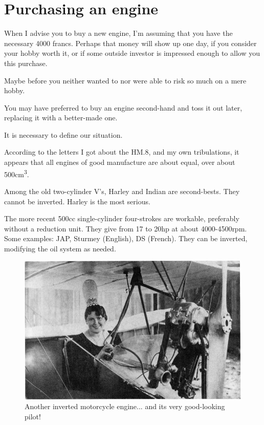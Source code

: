 \documentclass{book}
\begin{document}
\section{Purchasing an engine}

When I advise you to buy a new engine, I'm assuming that you have the
necessary 4000 francs.  Perhaps that money will show up one day, if
you consider your hobby worth it, or if some outside investor is
impressed enough to allow you this purchase.

Maybe before you neither wanted to nor were able to risk so much on a
mere hobby.

You may have preferred to buy an engine second-hand and toss it out
later, replacing it with a better-made one.

It is necessary to define our situation.

According to the letters I got about the HM.8, and my own
tribulations, it appears that all engines of good manufacture are
about equal, over about 500cm\textsuperscript{3}.

Among the old two-cylinder V's, Harley and Indian are second-bests.
They cannot be inverted.  Harley is the most serious.

The more recent 500cc single-cylinder four-strokes are workable,
preferably without a reduction unit.  They give from 17 to 20hp at
about 4000-4500rpm.  Some examples: JAP, Sturmey (English), DS
(French).  They can be inverted, modifying the oil system as needed.

\begin{figure}
  \includegraphics[width=\linewidth]{fig-55.jpg}
  \caption{Another inverted motorcycle engine... and its very
    good-looking pilot!}
  \label{fig:fiftyfive}
\end{figure}
\end{document}
